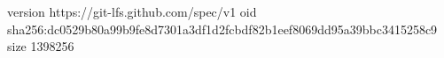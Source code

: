 version https://git-lfs.github.com/spec/v1
oid sha256:dc0529b80a99b9fe8d7301a3df1d2fcbdf82b1eef8069dd95a39bbc3415258c9
size 1398256
